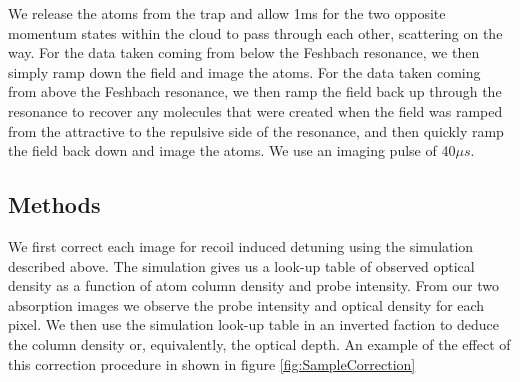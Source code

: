 \documentclass[12pt]{iopart}
\begin{document}
\par We release the atoms from the trap and allow 1ms for the two opposite momentum states within the cloud to pass through each other, scattering on the way. For the data taken coming from below the Feshbach resonance, we then simply ramp down the field and image the atoms. For the data taken coming from above the Feshbach resonance, we then ramp the field back up through the resonance to recover any molecules that were created when the field was ramped from the attractive to the repulsive side of the resonance, and then quickly ramp the field back down and image the atoms. We use an imaging pulse of 40$\mu s$.
\subsection{Methods}
We first correct each image for recoil induced detuning using the simulation described above. The simulation gives us a look-up table of observed optical density as a function of atom column density and probe intensity. From our two absorption images we observe the probe intensity and optical density for each pixel. We then use the simulation look-up table in an inverted faction to deduce the column density or, equivalently, the optical depth. An example of the effect of this correction procedure in shown in figure \ref{fig:SampleCorrection}
\end{document}
